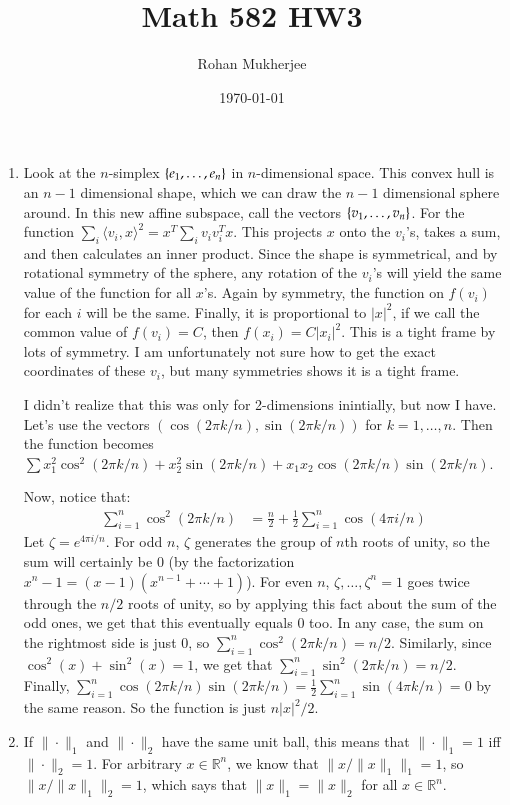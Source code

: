 \documentclass[12pt]{article}
\title{Math 582 HW3}
\date{\today}
\author{Rohan Mukherjee}
\theoremstyle{definitionstyle}
\def\mbb#1{\mathbb{#1}}
\def\R{\mbb{R}}
\newcommand{\mg}[1]{\| #1 \|}
\renewcommand{\ip}[1]{\langle#1\rangle}
\newcommand{\SET}[1]{\Set{\mskip-\medmuskip #1 \mskip-\medmuskip}}
\newcommand{\1}{\mathds 1}
\begin{document}
    \maketitle
    \begin{enumerate}
        \item Look at the $n$-simplex $\SET{e_1, \ldots, e_n}$ in $n$-dimensional space. This convex hull is an $n-1$ dimensional shape, which we can draw the $n-1$ dimensional sphere around. In this new affine subspace, call the vectors $\SET{v_1, \ldots, v_n}$. For the function $\sum_i \ip{v_i, x}^2 = x^T \sum_i v_iv_i^T x$. This projects $x$ onto the $v_i$'s, takes a sum, and then calculates an inner product. Since the shape is symmetrical, and by rotational symmetry of the sphere, any rotation of the $v_i$'s will yield the same value of the function for all $x$'s. Again by symmetry, the function on $f(v_i)$ for each $i$ will be the same. Finally, it is proportional to $|x|^2$, if we call the common value of $f(v_i) = C$, then $f(x_i) = C|x_i|^2$. This is a tight frame by lots of symmetry. I am unfortunately not sure how to get the exact coordinates of these $v_i$, but many symmetries shows it is a tight frame.

        I didn't realize that this was only for 2-dimensions inintially, but now I have. Let's use the vectors $(\cos(2\pi k/n), \sin(2 \pi k/n))$ for $k = 1, \ldots, n$. Then the function becomes $\sum x_1^2 \cos^2(2\pi k /n) + x_2^2 \sin(2\pi k/n) + x_1x_2 \cos(2\pi k/n) \sin(2 \pi k / n)$.

        Now, notice that:
        \begin{align*}
            \sum_{i=1}^n \cos^2(2\pi k/n) &= \frac n2 + \frac 1 2 \sum_{i=1}^n \cos(4\pi i/n)
        \end{align*}
        Let $\zeta = e^{4\pi i/n}$. For odd $n$, $\zeta$ generates the group of $n$th roots of unity, so the sum will certainly be 0 (by the factorization $x^n - 1 = (x-1)(x^{n-1} + \cdots + 1)$). For even $n$, $\zeta, \ldots, \zeta^n = 1$ goes twice through the $n/2$ roots of unity, so by applying this fact about the sum of the odd ones, we get that this eventually equals 0 too. In any case, the sum on the rightmost side is just 0, so $\sum_{i=1}^n \cos^2(2\pi k/n) = n/2$. Similarly, since $\cos^2(x) + \sin^2(x) = 1$, we get that $\sum_{i=1}^n \sin^2(2\pi k/n) = n/2$. Finally, $\sum_{i=1}^n \cos(2\pi k/n) \sin(2\pi k/n) = \frac 12\sum_{i=1}^n \sin(4\pi k/n) = 0$ by the same reason. So the function is just $n|x|^2/2$.

        \item If $\mg{\cdot}_1$ and $\mg{\cdot}_2$ have the same unit ball, this means that $\mg{\cdot}_1 = 1$ iff $\mg{\cdot}_2 = 1$. For arbitrary $x \in \R^n$, we know that $\mg{x/\mg{x}_1}_1 = 1$, so $\mg{x/\mg{x}_1}_2 = 1$, which says that $\mg{x}_1 = \mg{x}_2$ for all $x \in \R^n$. 


\end{enumerate}
\end{document}
